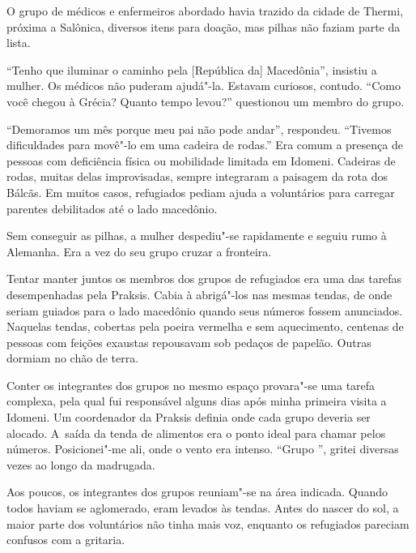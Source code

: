 O grupo de médicos e enfermeiros abordado havia trazido da cidade de
Thermi, próxima a Salônica, diversos itens para doação, mas pilhas não faziam parte da lista.

``Tenho que iluminar o caminho pela {[}República da{]} Macedônia'',
insistiu a mulher. Os médicos não puderam ajudá"-la. Estavam curiosos,
contudo. ``Como você chegou à Grécia? Quanto tempo levou?'' questionou
um membro do grupo.

``Demoramos um mês porque meu pai não pode andar'', respondeu.
``Tivemos dificuldades para movê"-lo em uma cadeira de rodas.''
 Era comum a presença de pessoas com deficiência física ou mobilidade limitada em Idomeni.
 Cadeiras de rodas, muitas delas improvisadas, sempre integraram a paisagem da rota dos Bálcãs. Em muitos
casos, refugiados pediam ajuda a voluntários para carregar parentes
debilitados até o lado macedônio.

Sem conseguir as pilhas, a mulher despediu"-se rapidamente e seguiu rumo
à Alemanha. Era a vez do seu grupo cruzar a fronteira.


Tentar manter juntos os membros dos grupos de refugiados era uma das
tarefas desempenhadas pela Praksis. Cabia à  abrigá"-los nas mesmas
tendas, de onde seriam guiados para o lado macedônio quando seus
números fossem anunciados. Naquelas tendas, cobertas pela poeira
vermelha e sem aquecimento, centenas de pessoas com feições exaustas
repousavam sob pedaços de papelão. Outras dormiam no chão de terra.

Conter os integrantes dos grupos no mesmo espaço provara"-se uma tarefa
complexa, pela qual fui responsável alguns dias após minha primeira
visita a Idomeni. Um coordenador da Praksis definia onde cada grupo
deveria ser alocado. A~saída da tenda de alimentos era o ponto ideal
para chamar pelos números. Posicionei"-me ali, onde o vento era intenso. ``Grupo '', gritei diversas vezes
ao longo da madrugada.

Aos poucos, os integrantes dos grupos reuniam"-se na área indicada.
Quando todos haviam se aglomerado, eram levados às tendas. Antes do
nascer do sol, a maior parte dos voluntários não tinha mais voz,
enquanto os refugiados pareciam confusos com a gritaria.

